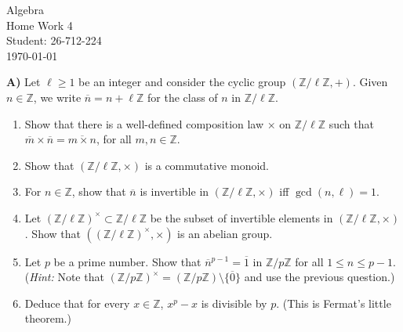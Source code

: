 \documentclass[12pt,a4paper]{article}
\begin{document}
\begin{titlepage}
\centering
\vspace*{\fill}
{\Huge Algebra} \\[0.5cm]
{\Huge Home Work 4}\\[1.5cm]
{\Large Student: 26-712-224}\\[0.5cm]
{\Large \today}
\vspace*{\fill}
\end{titlepage}

\newpage
\noindent\textbf{A)} Let $\ell \geq 1$ be an integer and consider the cyclic group $(\mathbb{Z}/\ell\mathbb{Z},+)$. Given $n\in\mathbb{Z}$, we write $\overline{n}=n+\ell\mathbb{Z}$ for the class of $n$ in $\mathbb{Z}/\ell\mathbb{Z}$.
\begin{enumerate}
\item[(1)] Show that there is a well-defined composition law $\times$ on $\mathbb{Z}/\ell\mathbb{Z}$ such that $\overline{m}\times\overline{n}=\overline{m\times n}$, for all $m,n\in\mathbb{Z}$.
\item[(2)] Show that $(\mathbb{Z}/\ell\mathbb{Z},\times)$ is a commutative monoid.
\item[(3)] For $n\in\mathbb{Z}$, show that $\overline{n}$ is invertible in $(\mathbb{Z}/\ell\mathbb{Z},\times)$ iff $\gcd(n,\ell)=1$.
\item[(4)] Let $(\mathbb{Z}/\ell\mathbb{Z})^\times\subset\mathbb{Z}/\ell\mathbb{Z}$ be the subset of invertible elements in $(\mathbb{Z}/\ell\mathbb{Z},\times)$. Show that $((\mathbb{Z}/\ell\mathbb{Z})^\times,\times)$ is an abelian group.
\item[(5)] Let $p$ be a prime number. Show that $\overline{n}^{p-1}=\overline{1}$ in $\mathbb{Z}/p\mathbb{Z}$ for all $1\leq n\leq p-1$.
(\textit{Hint:} Note that $(\mathbb{Z}/p\mathbb{Z})^\times=(\mathbb{Z}/p\mathbb{Z})\setminus\{\overline{0}\}$ and use the previous question.)
\item[(6)] Deduce that for every $x\in\mathbb{Z}$, $x^p-x$ is divisible by $p$. (This is Fermat's little theorem.)
\end{enumerate}
\end{document}
